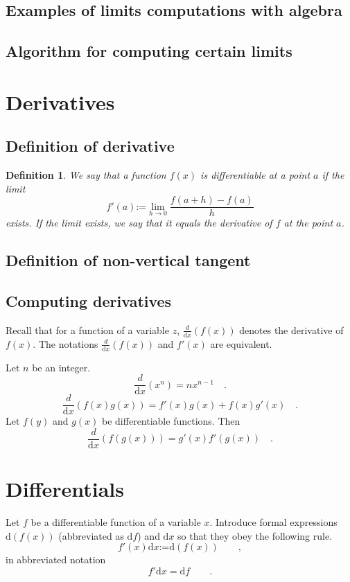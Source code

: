 \documentclass[12pt]{book}
\newcommand{\diff}{\text{d}}
\newcommand{\eqdef}{\textbf{:=}}
\newcommand{\importantFormula}[1]{\begin{equation} \boxed{#1} \end{equation}}
\newtheorem{definition}[theorem]{Definition}
\begin{document}
\subsection{Examples of limits computations with algebra}



\subsection{Algorithm for computing certain limits}


\section{Derivatives}

\subsection{Definition of derivative}\label{secDerivative}
\begin{definition}
We say that a function $f(x)$ is differentiable at a point $a$ if the limit 
\begin{equation}\label{eqDefDerivative}
f'(a)\eqdef \lim_{h\to 0} \frac{f(a+h)-f(a)}{h}
\end{equation}
exists. If the limit exists, we say that it equals the derivative of $f$ at the point $a$.
\end{definition}

\subsection{Definition of non-vertical tangent}
\label{secDefTangent}

\subsection{Computing derivatives}
Recall that for a function of a variable $z$, $\frac{d}{\diff x}(f(x))$ denotes the derivative of $f(x)$. The notations $\frac{d}{\diff x}(f(x))$ and $f'(x)$ are equivalent. 

Let $n$ be an integer. 
\[
\frac{d}{\diff x} (x^n)= n x^{n-1}\quad .
\]
\[
\frac{d}{\diff x} (f(x)g(x)) = f'(x)g(x)+f(x)g'(x) \quad .
\]
Let $f(y)$ and $g(x)$ be differentiable functions.  Then
\[
\frac{d}{\diff x} \left(f( g(x))\right)= g'(x) f'(g(x)) \quad .
\]




\section{Differentials}
Let $f$ be a differentiable function of a variable $x$. Introduce formal expressions $\diff(f(x))$ (abbreviated as $\diff f$) and $\diff x$ so that they obey the following rule.
\importantFormula{
f'(x)\diff x\eqdef \diff(f(x))\quad \quad,
}
in abbreviated notation 
\importantFormula{
f'\diff x = \diff f\quad \quad .
}
\end{document}
